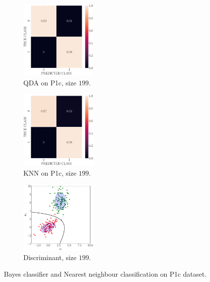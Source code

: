 \documentclass[11pt, a4 paper]{article}
\begin{document}
\begin{figure}[!htbp]
\quad    
    \begin{subfigure}[!htbp]{0.24\textwidth}
       \centering
       \includegraphics[width=1.5in]{../results/ex1/conf_mtx_QD_ML_dataset_P1c_size_199.pdf}
       \caption{QDA on P1c, size $199$.}
       \label{fig:KNN_P1c_199}
    \end{subfigure}
\quad    
    \begin{subfigure}[!htbp]{0.24\textwidth}
       \centering
       \includegraphics[width=1.5in]{../results/ex1/conf_mtx_KNN_dataset_P1c_size_199.pdf}
       \caption{KNN on P1c, size $199$.}
       \label{fig:KNN_P1c_199}
    \end{subfigure}
\quad
    \begin{subfigure}[!htbp]{0.24\textwidth}
       \centering
       \includegraphics[width=1.5in]{../results/ex1/samples_QD_ML_dataset_P1c_size_199.pdf}
       \caption{Discriminant, size $199$.}
       \label{fig:KNN_P1c_199}
    \end{subfigure}

\caption{Bayes classifier and Nearest neighbour classification on P1c dataset.}
\label{fig:ex11P1c}
\end{figure}
\end{document}
